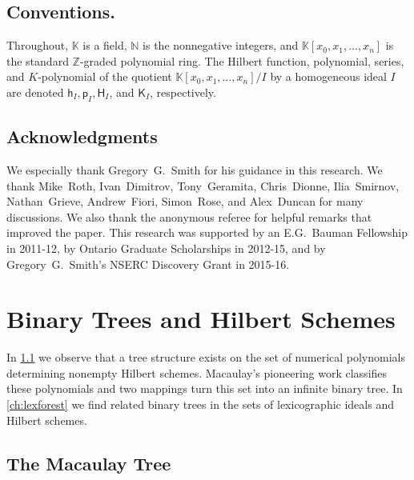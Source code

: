 \documentclass[12pt]{amsart}%
\theoremstyle{definition}%
\newcommand{\hf}{\mathsf{h}}%
\newcommand{\hp}{\mathsf{p}}%
\newcommand{\hs}{\mathsf{H}}%
\newcommand{\hk}{\mathsf{K}}%
\newcommand{\kk}{\mathbb{K}}%
\newcommand{\NN}{\mathbb{N}}%
\newcommand{\ZZ}{\mathbb{Z}}%
\begin{document}
\subsection*{Conventions.}

Throughout, $\kk$ is a field, $\NN$ is the nonnegative integers, and
$\kk[x_0, x_1, \dotsc, x_n]$ is the standard $\ZZ$-graded polynomial
ring.  The Hilbert function, polynomial, series, and
$K$\nobreakdash-polynomial of the quotient $\kk[x_0, x_1, \dotsc, x_n]
/ I$ by a homogeneous ideal $I$ are denoted $\hf_I, \hp_I, \hs_I$, and
$\hk_I$, respectively.


\subsection*{Acknowledgments}

We especially thank Gregory~G.~Smith for his guidance in this
research.  We thank Mike~Roth, Ivan~Dimitrov, Tony~Geramita,
Chris~Dionne, Ilia~Smirnov, Nathan~Grieve, Andrew~Fiori, Simon~Rose,
and Alex~Duncan for many discussions.  We also thank the anonymous
referee for helpful remarks that improved the paper.  This research
was supported by an E.G.~Bauman Fellowship in 2011-12, by Ontario
Graduate Scholarships in 2012-15, and by Gregory~G.~Smith's NSERC
Discovery Grant in 2015-16.




\section{Binary Trees and Hilbert Schemes}

In \ref{ch:Macaulaytree} we observe that a tree structure exists on
the set of numerical polynomials determining nonempty Hilbert schemes.
Macaulay's pioneering work \cite{Macaulay--1927} classifies these
polynomials and two mappings turn this set into an infinite binary
tree.  In \ref{ch:lexforest} we find related binary trees in the sets
of lexicographic ideals and Hilbert schemes.

\subsection{The Macaulay Tree}
\label{ch:Macaulaytree}
\end{document}
